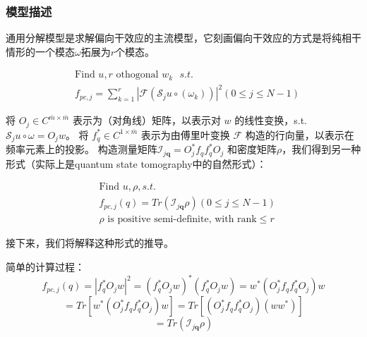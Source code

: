 \documentclass[12pt]{article}
\begin{document}
\subsubsection{模型描述}

通用分解模型是求解偏向干效应的主流模型，它刻画偏向干效应的方式是将纯相干情形的一个模态$\omega$拓展为$r$个模态。 

\begin{equation}
\label{sep} 
\begin{aligned}
&\mbox{Find } u, r \mbox{ othogonal $w_k$   }s.t. \\
&f_{p c, j}=\sum_{k=1}^r \left|\mathcal{F}\left( \mathcal{S}_{j} u \circ \left(\omega_k\right) \right)\right|^{2} (0\leq j \leq N-1)
\end{aligned}
\end{equation}




将 $O_j \in C^{\bar{m} \times \bar{m}}$ 表示为（对角线）矩阵，以表示对 $w$ 的线性变换，s.t. $\mathcal{S}_{j} u \circ \omega = O_j w$。 将 $f_q^* \in C^{1 \times \bar{m}}$ 表示为由傅里叶变换 $\mathcal{F}$ 构造的行向量，以表示在频率元素上的投影。 构造测量矩阵$ \mathcal{I}_{j \mathbf{q}} = O_j^*f_qf_q^*O_j$ 和密度矩阵$\rho$，我们得到另一种形式（实际上是quantum state tomography中的自然形式）：

\begin{equation}
\label{lift}
\begin{aligned}
&\mbox{Find } u,\rho,s.t.\\
&f_{pc,j}(q) = Tr(\mathcal{I}_{j \mathbf{q}} \rho ) (0\leq j \leq N-1)\\
&\rho \mbox{ is positive semi-definite, with rank}\leq r 
\end{aligned}
\end{equation}

接下来，我们将解释这种形式的推导。

简单的计算过程：
$$
f_{pc,j}(q) = |f_q^*O_j w|^2 = (f_q^*O_j w)^*(f_q^*O_j w) = w^*(O_j^*f_qf_q^*O_j)w
$$
$$
=Tr[w^*(O_j^*f_qf_q^*O_j)w]=Tr[(O_j^*f_qf_q^*O_j) (ww^*)]
$$
$$
=Tr(  \mathcal{I}_{j \mathbf{q}} \rho )
$$
\end{document}

